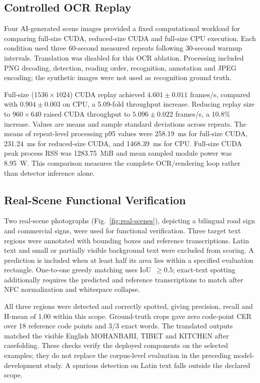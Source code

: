 \documentclass[cspaper,journal,10pt]{IEEEtran}
\begin{document}
\subsection{Controlled OCR Replay}
Four AI-generated scene images provided a fixed computational workload for comparing full-size CUDA, reduced-size CUDA and full-size CPU execution. Each condition used three 60-second measured repeats following 30-second warmup intervals. Translation was disabled for this OCR ablation. Processing included PNG decoding, detection, reading order, recognition, annotation and JPEG encoding; the synthetic images were not used as recognition ground truth.

Full-size ($1536\times1024$) CUDA replay achieved $4.601\pm0.011$ frames/s, compared with $0.904\pm0.003$ on CPU, a 5.09-fold throughput increase. Reducing replay size to $960\times640$ raised CUDA throughput to $5.096\pm0.022$ frames/s, a 10.8\% increase. Values are means and sample standard deviations across repeats. The means of repeat-level processing p95 values were 258.19~ms for full-size CUDA, 231.24~ms for reduced-size CUDA, and 1468.39~ms for CPU. Full-size CUDA peak process RSS was 1283.75~MiB and mean sampled module power was 8.95~W. This comparison measures the complete OCR/rendering loop rather than detector inference alone.

\subsection{Real-Scene Functional Verification}
Two real-scene photographs (Fig.~\ref{fig:real-scenes}), depicting a bilingual road sign and commercial signs, were used for functional verification. Three target text regions were annotated with bounding boxes and reference transcriptions. Latin text and small or partially visible background text were excluded from scoring. A prediction is included when at least half its area lies within a specified evaluation rectangle. One-to-one greedy matching uses IoU~$\geq0.5$; exact-text spotting additionally requires the predicted and reference transcriptions to match after NFC normalization and whitespace collapse.

All three regions were detected and correctly spotted, giving precision, recall and H-mean of 1.00 within this scope. Ground-truth crops gave zero code-point CER over 18 reference code points and 3/3 exact words. The translated outputs matched the visible English MOHANBARI, TIBET and KITCHEN after casefolding. These checks verify the deployed components on the selected examples; they do not replace the corpus-level evaluation in the preceding model-development study. A spurious detection on Latin text falls outside the declared scope.
\end{document}
